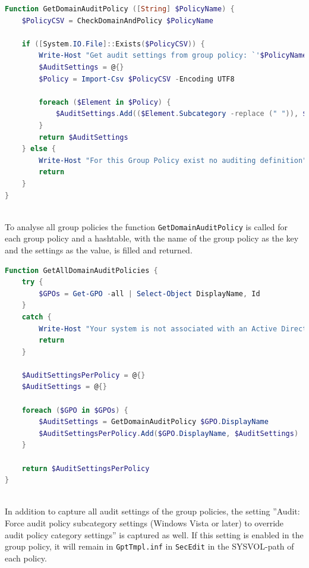 \begin{lstlisting}[caption=Function GetDomainAuditPolicy, language=PowerShell]
Function GetDomainAuditPolicy ([String] $PolicyName) {
    $PolicyCSV = CheckDomainAndPolicy $PolicyName

    if ([System.IO.File]::Exists($PolicyCSV)) {
        Write-Host "Get audit settings from group policy: `'$PolicyName`'"
        $AuditSettings = @{}
        $Policy = Import-Csv $PolicyCSV -Encoding UTF8

        foreach ($Element in $Policy) {
            $AuditSettings.Add(($Element.Subcategory -replace (" ")), $Element."Setting Value")
        }  
        return $AuditSettings
    } else {
        Write-Host "For this Group Policy exist no auditing definition" 
        return
    }
}
\end{lstlisting} \ \\
To analyse all group policies the function \lstinline|GetDomainAuditPolicy| is called for each group policy and a hashtable, with the name of the group policy as the key and the settings as the value, is filled and returned.
\begin{lstlisting}[caption=Function GetAllDomainAuditPolicies, language=PowerShell]
Function GetAllDomainAuditPolicies {
    try {
        $GPOs = Get-GPO -all | Select-Object DisplayName, Id
    }
    catch {
        Write-Host "Your system is not associated with an Active Directory domain or forest"
        return
    }
    
    $AuditSettingsPerPolicy = @{}
    $AuditSettings = @{}

    foreach ($GPO in $GPOs) {
        $AuditSettings = GetDomainAuditPolicy $GPO.DisplayName
        $AuditSettingsPerPolicy.Add($GPO.DisplayName, $AuditSettings)
    }
    
    return $AuditSettingsPerPolicy
}
\end{lstlisting}

\clearpage \ \\
In addition to capture all audit settings of the group policies, the setting ''Audit: Force audit policy subcategory settings (Windows Vista or later) to override audit policy category settings'' is captured as well. If this setting is enabled in the group policy, it will remain in \lstinline|GptTmpl.inf| in \lstinline|SecEdit| in the SYSVOL-path of each policy.


